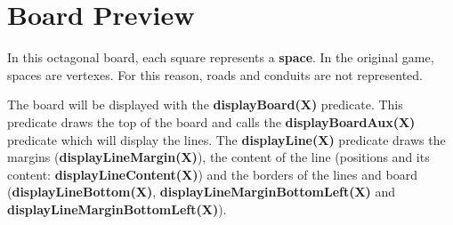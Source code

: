 \documentclass[a4paper]{article}
\begin{document}


\section{Board Preview}

In this octagonal board, each square represents a \textbf{space}. In the original game, spaces are vertexes. For this reason, roads and conduits are not represented.

The board will be displayed with the \textbf{displayBoard(X)} predicate. This predicate draws the top of the board and calls the \textbf{displayBoardAux(X)} predicate which will display the lines. The \textbf{displayLine(X)} predicate draws the margins (\textbf{displayLineMargin(X)}), the content of the line (positions and its content: \textbf{displayLineContent(X)}) and the borders of the lines and board (\textbf{displayLineBottom(X)}, \textbf{displayLineMarginBottomLeft(X)} and \textbf{displayLineMarginBottomLeft(X)}).
\end{document}
